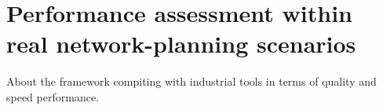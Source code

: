 
\chapter{Performance assessment within real network-planning scenarios}


\noindent About the framework compiting with industrial tools in terms
of quality and speed performance.
